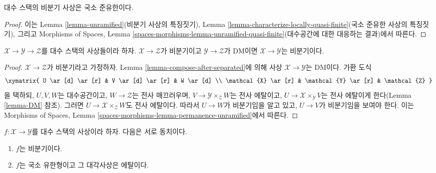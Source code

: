 \begin{lemma}
\label{lemma-unramified-quasi-finite}
대수 스택의 비분기 사상은 국소 준유한이다.
\end{lemma}

\begin{proof}
이는 Lemma \ref{lemma-unramified}(비분기 사상의 특징짓기), Lemma
\ref{lemma-characterize-locally-quasi-finite}(국소 준유한 사상의 특징짓기),
그리고 Morphisms of Spaces, Lemma
\ref{spaces-morphisms-lemma-unramified-quasi-finite}(대수공간에 대한 대응하는
결과)에서 따른다.
\end{proof}

\begin{lemma}
\label{lemma-permanence-unramified}
$\mathcal{X} \to \mathcal{Y} \to \mathcal{Z}$를 대수 스택의 사상들이라
하자. $\mathcal{X} \to \mathcal{Z}$가 비분기이고
$\mathcal{Y} \to \mathcal{Z}$가 DM이면
$\mathcal{X} \to \mathcal{Y}$는 비분기이다.
\end{lemma}

\begin{proof}
$\mathcal{X} \to \mathcal{Z}$가 비분기라고 가정하자. Lemma
\ref{lemma-compose-after-separated}에 의해 사상
$\mathcal{X} \to \mathcal{Y}$는 DM이다. 가환 도식
$$
\xymatrix{
U \ar[d] \ar[r] & V \ar[d] \ar[r] & W \ar[d] \\
\mathcal{X} \ar[r] & \mathcal{Y} \ar[r] & \mathcal{Z}
}
$$
을 택하되, $U, V, W$는 대수공간이고, $W \to \mathcal{Z}$는 전사
매끄러우며, $V \to \mathcal{Y} \times_\mathcal{Z} W$는 전사 에탈이고,
$U \to \mathcal{X} \times_\mathcal{Y} V$는 전사 에탈이게 한다(Lemma
\ref{lemma-DM} 참조). 그러면
$U \to \mathcal{X} \times_\mathcal{Z} W$도 전사 에탈이다. 따라서
$U \to W$가 비분기임을 알고 있고, $U \to V$가 비분기임을 보여야 한다.
이는 Morphisms of Spaces, Lemma
\ref{spaces-morphisms-lemma-permanence-unramified}에서 따른다.
\end{proof}

\begin{lemma}
\label{lemma-characterize-unramified}
$f : \mathcal{X} \to \mathcal{Y}$를 대수 스택의 사상이라 하자. 다음은
서로 동치이다.
\begin{enumerate}
\item $f$는 비분기이다.
\item $f$는 국소 유한형이고 그 대각사상은 에탈이다.
\end{enumerate}
\end{lemma}

